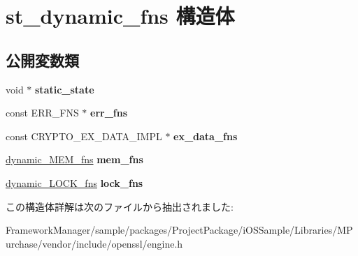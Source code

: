 \hypertarget{structst__dynamic__fns}{}\section{st\+\_\+dynamic\+\_\+fns 構造体}
\label{structst__dynamic__fns}
\subsection*{公開変数類}
\begin{DoxyCompactItemize}
\item 
\hypertarget{structst__dynamic__fns_abaade597a7f70ea7b75c4ad2f656fb92}{}void $\ast$ {\bfseries static\+\_\+state}\label{structst__dynamic__fns_abaade597a7f70ea7b75c4ad2f656fb92}

\item 
\hypertarget{structst__dynamic__fns_a01d513d12727c5a3f86e6b7370476197}{}const E\+R\+R\+\_\+\+F\+N\+S $\ast$ {\bfseries err\+\_\+fns}\label{structst__dynamic__fns_a01d513d12727c5a3f86e6b7370476197}

\item 
\hypertarget{structst__dynamic__fns_abf1fdf43c6222c63ea213bddd9163886}{}const C\+R\+Y\+P\+T\+O\+\_\+\+E\+X\+\_\+\+D\+A\+T\+A\+\_\+\+I\+M\+P\+L $\ast$ {\bfseries ex\+\_\+data\+\_\+fns}\label{structst__dynamic__fns_abf1fdf43c6222c63ea213bddd9163886}

\item 
\hypertarget{structst__dynamic__fns_a337f97c16bdfd0bbe3e4432fa32b29c4}{}\hyperlink{structst__dynamic___m_e_m__fns}{dynamic\+\_\+\+M\+E\+M\+\_\+fns} {\bfseries mem\+\_\+fns}\label{structst__dynamic__fns_a337f97c16bdfd0bbe3e4432fa32b29c4}

\item 
\hypertarget{structst__dynamic__fns_a95857186710500c6c349a79f22ac5b05}{}\hyperlink{structst__dynamic___l_o_c_k__fns}{dynamic\+\_\+\+L\+O\+C\+K\+\_\+fns} {\bfseries lock\+\_\+fns}\label{structst__dynamic__fns_a95857186710500c6c349a79f22ac5b05}

\end{DoxyCompactItemize}


この構造体詳解は次のファイルから抽出されました\+:\begin{DoxyCompactItemize}
\item 
Framework\+Manager/sample/packages/\+Project\+Package/i\+O\+S\+Sample/\+Libraries/\+M\+Purchase/vendor/include/openssl/engine.\+h\end{DoxyCompactItemize}
